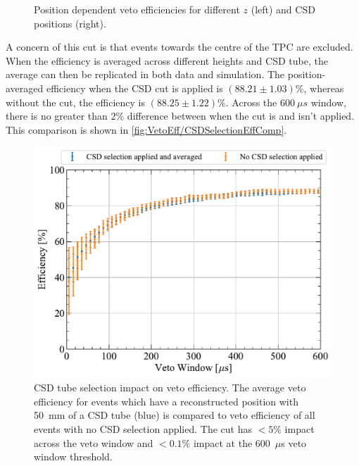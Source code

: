 \begin{enumerate}
\begin{figure}[!ht]
\begin{subfigure}[b]{0.48\textwidth}
    	\end{subfigure}
    	\caption{Position dependent veto efficiencies for different $z$ (left) and CSD positions (right).}
    	\label{fig:VetoEff/VetoEffPositionDependence}
    \end{figure}
	A concern of this cut is that events towards the centre of the TPC are excluded. When the efficiency is averaged across different heights and CSD tube, the average can then be replicated in both data and simulation. 
    The position-averaged efficiency when the CSD cut is applied is $(88.21\pm1.03)\%$, whereas without the cut, the efficiency is $(88.25\pm1.22)\%$.
	Across the $600~\mu s$ window, there is no greater than $2\%$ difference between when the cut is and isn't applied.
	This comparison is shown in \autoref{fig:VetoEff/CSDSelectionEffComp}.
    \begin{figure}[!ht]
    	\centering
    	\includegraphics[width=0.7\linewidth]{figures/VetoEfficiency/CSDSelectionCheck.pdf}
    	\caption[CSD tube selection impact on veto efficiency.]{CSD tube selection impact on veto efficiency. The average veto efficiency for events which have a reconstructed position with 50~mm of a CSD tube (blue) is compared to veto efficiency of all events with no CSD selection applied. The cut has $<5\%$ impact across the veto window and $<0.1\%$ impact at the 600~$\mu$s veto window threshold.}
    	\label{fig:VetoEff/CSDSelectionEffComp}
    \end{figure}


\end{enumerate}
